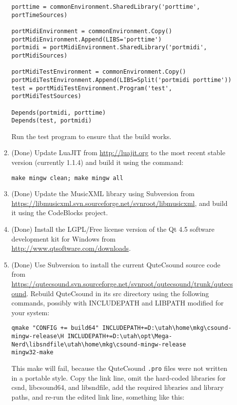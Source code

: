 \documentclass[11pt,letterpaper,onecolumn]{scrartcl}
\begin{document}
\begin{sloppypar}
\begin{enumerate}
\begin{enumerate}
\begin{lstlisting}
porttime = commonEnvironment.SharedLibrary('porttime', portTimeSources)

portMidiEnvironment = commonEnvironment.Copy()
portMidiEnvironment.Append(LIBS='porttime')
portmidi = portMidiEnvironment.SharedLibrary('portmidi', portMidiSources)

portMidiTestEnvironment = commonEnvironment.Copy()
portMidiTestEnvironment.Append(LIBS=Split('portmidi porttime'))
test = portMidiTestEnvironment.Program('test', portMidiTestSources)

Depends(portmidi, porttime)
Depends(test, portmidi)
\end{lstlisting}

			Run the test program to ensure that the build works.
		  
		  \item (Done) Update LuaJIT from \url{http://luajit.org} to the most recent stable version (currently 1.1.4) and build it using the command:
		  
\begin{lstlisting}
make mingw clean; make mingw all
\end{lstlisting}

			\item (Done) Update the MusicXML library using Subversion from \url{https://libmusicxml.svn.sourceforge.net/svnroot/libmusicxml}, and build it using the CodeBlocks project.

			\item (Done) Install the LGPL/Free license version of the Qt 4.5 software development kit for Windows from \url{http://www.qtsoftware.com/downloads}.
			
			\item (Done) Use Subversion to install the current QuteCsound source code from \url{https://qutecsound.svn.sourceforge.net/svnroot/qutecsound/trunk/qutecsound}. Rebuild QuteCsound in its src directory using the following commands, possibly with INCLUDEPATH and LIBPATH modified for your system:
			
			\begin{lstlisting}
qmake "CONFIG += build64" INCLUDEPATH+=D:\utah\home\mkg\csound-mingw-release\H INCLUDEPATH+=D:\utah\opt\Mega-Nerd\libsndfile\utah\home\mkg\csound-mingw-release
mingw32-make
			\end{lstlisting}
			
			\noindent This make will fail, because the QuteCsound \texttt{.pro} files were not written in a portable style. Copy the link line, omit the hard-coded libraries for csnd, libcsound64, and libsndfile, add the required libraries and library paths, and re-run the edited link line, something like this:
			

\end{enumerate}
\end{enumerate}
\end{sloppypar}
\end{document}
